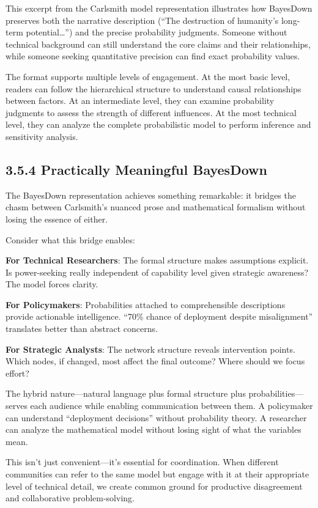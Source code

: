 \documentclass[
  11pt,
  letterpaper,
  openany]{book}
\begin{document}
\begin{landscape}
This excerpt from the Carlsmith model representation illustrates how
BayesDown preserves both the narrative description (``The destruction of
humanity's long-term potential\ldots{}'') and the precise probability
judgments. Someone without technical background can still understand the
core claims and their relationships, while someone seeking quantitative
precision can find exact probability values.

The format supports multiple levels of engagement. At the most basic
level, readers can follow the hierarchical structure to understand
causal relationships between factors. At an intermediate level, they can
examine probability judgments to assess the strength of different
influences. At the most technical level, they can analyze the complete
probabilistic model to perform inference and sensitivity analysis.

\subsection{3.5.4 Practically Meaningful
BayesDown}\label{sec-practically-meaningful}

The BayesDown representation achieves something remarkable: it bridges
the chasm between Carlsmith's nuanced prose and mathematical formalism
without losing the essence of either.

Consider what this bridge enables:

\textbf{For Technical Researchers}: The formal structure makes
assumptions explicit. Is power-seeking really independent of capability
level given strategic awareness? The model forces clarity.

\textbf{For Policymakers}: Probabilities attached to comprehensible
descriptions provide actionable intelligence. ``70\% chance of
deployment despite misalignment'' translates better than abstract
concerns.

\textbf{For Strategic Analysts}: The network structure reveals
intervention points. Which nodes, if changed, most affect the final
outcome? Where should we focus effort?

The hybrid nature---natural language plus formal structure plus
probabilities---serves each audience while enabling communication
between them. A policymaker can understand ``deployment decisions''
without probability theory. A researcher can analyze the mathematical
model without losing sight of what the variables mean.

This isn't just convenient---it's essential for coordination. When
different communities can refer to the same model but engage with it at
their appropriate level of technical detail, we create common ground for
productive disagreement and collaborative problem-solving.


\end{landscape}
\end{document}
